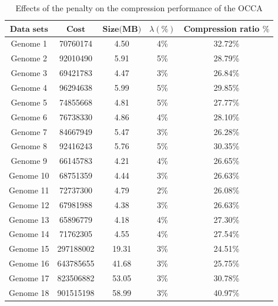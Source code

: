 \documentclass{singlecol-new}
\theoremstyle{TH}{
\newtheorem{lemma}{Lemma}
\newtheorem{theorem}[lemma]{Theorem}
\newtheorem{corrolary}[lemma]{Corrolary}
\newtheorem{conjecture}[lemma]{Conjecture}
\newtheorem{proposition}[lemma]{Proposition}
\newtheorem{claim}[lemma]{Claim}
\newtheorem{stheorem}[lemma]{Wrong Theorem}
}
\theoremstyle{THrm}{
\newtheorem{definition}{Definition}
\newtheorem{question}{Question}
\newtheorem{remark}{Remark}
\newtheorem{scheme}{Scheme}
}
\theoremstyle{THhit}{
\newtheorem{case}{Case}[section]
}
\begin{document}
\begin{table}[tpbh]
\small
\renewcommand{\arraystretch}{1.2}
\caption{Effects of  the penalty on the compression performance of the OCCA}
\begin{tabular}{c c c c c }
\toprule
$\textbf{Data sets}$ & $\textbf{Cost}$	& $\textbf{Size(MB)}$ &		\textbf{$\lambda (\%)$} &		\textbf{Compression ratio $\%$} \\\hline
Genome 1 &	 70760174 &4.50& 4\% & 32.72\%\\%
Genome 2 &	92010490& 5.91 & 5\%& 28.79\%\\%
Genome 3&	69421783& 4.47 &3\%& 26.84\%\\%
Genome 4&	96294638& 5.99 & 5\%& 29.85\%\\%
Genome 5&	74855668 &4.81& 5\%& 27.77\%\\%
Genome 6&	76738330& 4.86  &4\%& 28.10\%\\%
Genome 7&	84667949 &5.47& 3\%& 26.28\%\\%
Genome 8&	92416243 &5.76& 5\%& 30.35\%\\%
Genome 9&	66145783&4.21 & 4\%& 26.65\%\\%
Genome 10&	68751359& 4.44 &3\%& 26.63\%\\%
Genome 11&	72737300 &4.79& 2\%&26.08\%\\%
Genome 12&	67981988 & 4.38&3\%& 26.63\%\\%
Genome 13&	65896779& 4.18 &4\%& 27.30\%\\%
Genome 14&	71762305 &4.55 &4\%&27.54\% \\%
Genome 15&297188002 &19.31 & 3\%& 24.51\%\\%
Genome 16&643785655 & 41.68 & 3\%& 25.75\% \\%
Genome 17&823506882 & 53.05 & 3\%& 30.78\%\\%
Genome 18&901515198 &58.99 & 3\%& 40.97\%\\
\hline
\end{tabular}
\label{table5}
\end{table}
\end{document}
